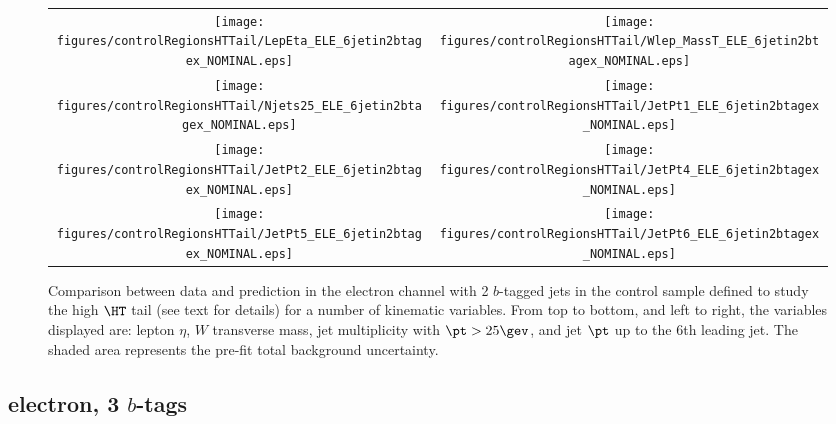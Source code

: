 \begin{figure}[htbp]
\begin{center}
\begin{tabular}{cc}
%
\texttt{[image: figures/controlRegionsHTTail/LepEta\_ELE\_6jetin2btagex\_NOMINAL.eps]} &
\texttt{[image: figures/controlRegionsHTTail/Wlep\_MassT\_ELE\_6jetin2btagex\_NOMINAL.eps]} \\
\texttt{[image: figures/controlRegionsHTTail/Njets25\_ELE\_6jetin2btagex\_NOMINAL.eps]} &
\texttt{[image: figures/controlRegionsHTTail/JetPt1\_ELE\_6jetin2btagex\_NOMINAL.eps]} \\
\texttt{[image: figures/controlRegionsHTTail/JetPt2\_ELE\_6jetin2btagex\_NOMINAL.eps]} &
\texttt{[image: figures/controlRegionsHTTail/JetPt4\_ELE\_6jetin2btagex\_NOMINAL.eps]} \\
\texttt{[image: figures/controlRegionsHTTail/JetPt5\_ELE\_6jetin2btagex\_NOMINAL.eps]} &
\texttt{[image: figures/controlRegionsHTTail/JetPt6\_ELE\_6jetin2btagex\_NOMINAL.eps]} \\
\end{tabular}\caption{\small {Comparison between data and prediction in the electron channel with 2 $b$-tagged jets in the control sample
defined to study the high $\HT$ tail (see text for details)  for a number of kinematic
variables. From top to bottom, and left to right, the variables displayed are: lepton $\eta$, $W$ transverse mass, jet multiplicity with $\pt>25\gev$, 
and jet $\pt$ up to the 6th leading jet.
The shaded area represents the pre-fit total background uncertainty.}}
\label{fig:ELE_controlHTTail_2btagex_2}
\end{center}
\end{figure}

\clearpage
\subsection{electron, 3 $b$-tags}
\label{sec:ELE_controlHTTail_3tagex}

